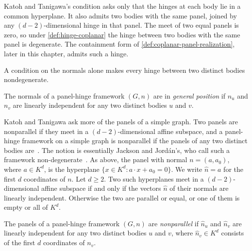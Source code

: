 Katoh and Tanigawa's condition asks only that the hinges at each body lie
in a common hyperplane. It also admits two bodies with the same panel,
joined by any $(d-2)$-dimensional hinge in that panel. The meet of two
equal panels is zero, so under \cref{def:hinge-coplanar} the hinge
between two bodies with the same panel is degenerate. The containment form
of \cref{def:coplanar-panel-realization}, later in this chapter, admits
such a hinge.

A condition on the normals alone makes every hinge between two distinct
bodies nondegenerate.

\begin{definition}
  \label{def:panel-general-position}
  \leanok
  The normals of a panel-hinge framework $(G, n)$ are in \emph{general
  position} if $n_u$ and $n_v$ are linearly independent for any two
  distinct bodies $u$ and $v$.
\end{definition}

Katoh and Tanigawa ask more of the panels of a simple graph. Two panels
are nonparallel if they meet in a $(d-2)$-dimensional affine subspace,
and a panel-hinge framework on a simple graph is nonparallel if the
panels of any two distinct bodies are~\cite[\S5.1,
p.~668]{katohTanigawa2011}. The notion is essentially Jackson and
Jord\'an's, who call such a framework
non-degenerate~\cite[\S7]{jacksonJordan2009}. As above, the panel with
normal $n = (a, a_0)$, where $a \in K^d$, is the hyperplane
$\{x \in K^d : a \cdot x + a_0 = 0\}$. We write $\hat n = a$ for the
first $d$ coordinates of $n$. Let $d \ge 2$. Two such hyperplanes meet
in a $(d-2)$-dimensional affine subspace if and only if the vectors
$\hat n$ of their normals are linearly independent. Otherwise the two
are parallel or equal, or one of them is empty or all of $K^d$.

\begin{definition}
  \label{def:panel-nonparallel}
  \leanok
  The panels of a panel-hinge framework $(G, n)$ are \emph{nonparallel}
  if $\hat n_u$ and $\hat n_v$ are linearly independent for any two
  distinct bodies $u$ and $v$, where $\hat n_v \in K^d$ consists of the
  first $d$ coordinates of $n_v$.
\end{definition}

